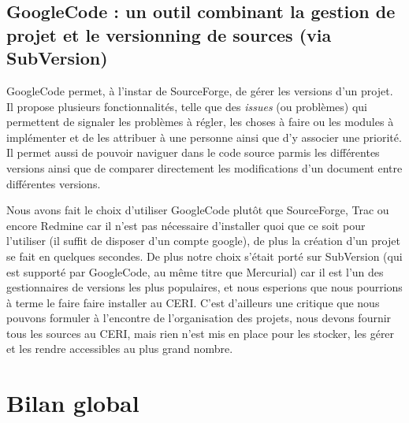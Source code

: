 \documentclass[10pt,a4paper]{article}
\begin{document}
\subsection{GoogleCode : un outil combinant la gestion de projet et le versionning de sources (via SubVersion)}
\par GoogleCode permet, à l'instar de SourceForge, de gérer les versions d'un projet. Il propose plusieurs fonctionnalités, telle que des \textit{issues} (ou problèmes) qui permettent de signaler les problèmes à régler, les choses à faire ou les modules à implémenter et de les attribuer à une personne ainsi que d'y associer une priorité. Il permet aussi de pouvoir naviguer dans le code source parmis les différentes versions ainsi que de comparer directement les modifications d'un document entre différentes versions.
\par Nous avons fait le choix d'utiliser GoogleCode plutôt que SourceForge, Trac ou encore Redmine car il n'est pas nécessaire d'installer quoi que ce soit pour l'utiliser (il suffit de disposer d'un compte google), de plus la création d'un projet se fait en quelques secondes. De plus notre choix s'était porté sur SubVersion (qui est supporté par GoogleCode, au même titre que Mercurial) car il est l'un des gestionnaires de versions les plus populaires, et nous esperions que nous pourrions à terme le faire faire installer au CERI. C'est d'ailleurs une critique que nous pouvons formuler à l'encontre de l'organisation des projets, nous devons fournir tous les sources au CERI, mais rien n'est mis en place pour les stocker, les gérer et les rendre accessibles au plus grand nombre.


\section{Bilan global}
\end{document}
